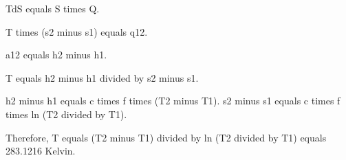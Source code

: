 TdS equals S times Q.  

T times (s2 minus s1) equals q12.  

a12 equals h2 minus h1.  

T equals h2 minus h1 divided by s2 minus s1.  

h2 minus h1 equals c times f times (T2 minus T1).  
s2 minus s1 equals c times f times ln (T2 divided by T1).  

Therefore, T equals (T2 minus T1) divided by ln (T2 divided by T1) equals 283.1216 Kelvin.